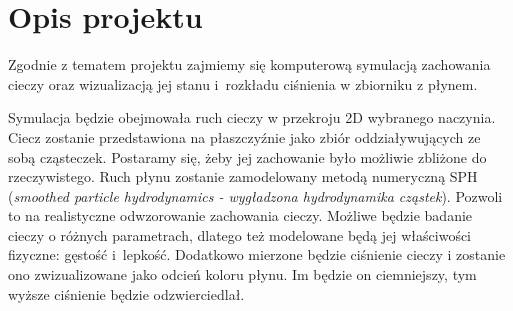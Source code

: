 \documentclass[a4paper]{article}
\begin{document}

\section{Opis projektu}
Zgodnie z tematem projektu zajmiemy się komputerową symulacją zachowania cieczy oraz wizualizacją jej stanu i~rozkładu ciśnienia w zbiorniku z płynem.

Symulacja będzie obejmowała ruch cieczy w przekroju 2D wybranego naczynia. Ciecz zostanie przedstawiona na płaszczyźnie jako zbiór oddziaływujących ze sobą cząsteczek.
Postaramy się, żeby jej zachowanie było możliwie zbliżone do rzeczywistego.
Ruch płynu zostanie zamodelowany metodą numeryczną SPH (\textit{smoothed particle hydrodynamics - wygładzona hydrodynamika cząstek}).
Pozwoli to na realistyczne odwzorowanie zachowania cieczy.
Możliwe będzie badanie cieczy o różnych parametrach, dlatego też modelowane będą jej właściwości fizyczne: gęstość i~lepkość.
Dodatkowo mierzone będzie ciśnienie cieczy i zostanie ono zwizualizowane jako odcień koloru płynu.
Im będzie on ciemniejszy, tym wyższe ciśnienie będzie odzwierciedlał.
\end{document}
